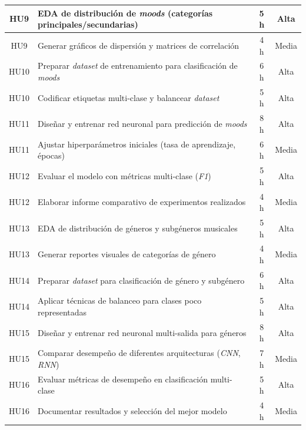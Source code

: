 \documentclass[
11pt, %
]{charter}
\begin{document}
\begin{table}[htpb]
\begin{tabularx}{\linewidth}{@{}|c|X|c|c|@{}}
HU9 & EDA de distribución de \textit{moods} (categorías principales/secundarias) & 5 h & Alta \\ \hline
HU9 & Generar gráficos de dispersión y matrices de correlación & 4 h & Media \\ \hline

HU10 & Preparar \textit{dataset} de entrenamiento para clasificación de \textit{moods} & 6 h & Alta \\ \hline
HU10 & Codificar etiquetas multi-clase y balancear \textit{dataset} & 5 h & Alta \\ \hline

HU11 & Diseñar y entrenar red neuronal para predicción de \textit{moods} & 8 h & Alta \\ \hline
HU11 & Ajustar hiperparámetros iniciales (tasa de aprendizaje, épocas) & 6 h & Media \\ \hline

HU12 & Evaluar el modelo con métricas multi-clase (\textit{F1}) & 5 h & Alta \\ \hline
HU12 & Elaborar informe comparativo de experimentos realizados & 4 h & Media \\ \hline

HU13 & EDA de distribución de géneros y subgéneros musicales & 5 h & Alta \\ \hline
HU13 & Generar reportes visuales de categorías de género & 4 h & Media \\ \hline

HU14 & Preparar \textit{dataset} para clasificación de género y subgénero & 6 h & Alta \\ \hline
HU14 & Aplicar técnicas de balanceo para clases poco representadas & 5 h & Alta \\ \hline

HU15 & Diseñar y entrenar red neuronal multi-salida para géneros & 8 h & Alta \\ \hline
HU15 & Comparar desempeño de diferentes arquitecturas (\textit{CNN}, \textit{RNN}) & 7 h & Media \\ \hline

HU16 & Evaluar métricas de desempeño en clasificación multi-clase & 5 h & Alta \\ \hline
HU16 & Documentar resultados y selección del mejor modelo & 4 h & Media \\ \hline

\end{tabularx}
\end{table}
\end{document}
